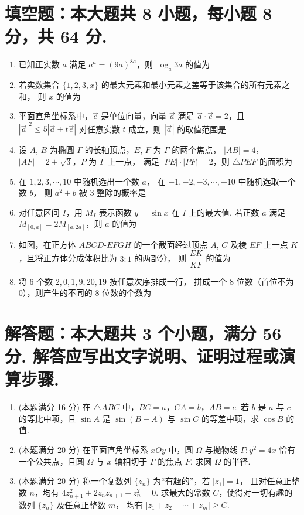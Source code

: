 \documentclass{chsmc}
\begin{document}
\section{填空题：本大题共 8 小题，每小题 8 分，共 64 分.}

\begin{enumerate}
  \item 已知正实数 $a$ 满足 $a^a = (9a)^{8a}$，则 $\log_a 3a$ 的值为 \blankline
  \item 若实数集合 $\{1, 2, 3, x\}$ 的最大元素和最小元素之差等于该集合的所有元素之和，
    则 $x$ 的值为 \blankline
  \item 平面直角坐标系中，$\vec{e}$ 是单位向量，向量 $\vec{a}$ 满足
    $\vec{a}\cdot\vec{e} = 2$，且 $|\vec{a}|^2 \leqslant 5|\vec{a} + t\vec{e}|$
    对任意实数 $t$ 成立，则 $|\vec{a}|$ 的取值范围是 \blankline
  \item 设 $A$, $B$ 为椭圆 $\Gamma$ 的长轴顶点，$E$, $F$ 为 $\Gamma$ 的两个焦点，
    $|AB| = 4$，$|AF| = 2 + \sqrt{3}$，$P$ 为 $\Gamma$ 上一点，
    满足 $|PE|\cdot|PF| = 2$，则 $\triangle PEF$ 的面积为 \blankline
  \item 在 $1, 2, 3, \cdots, 10$ 中随机选出一个数 $a$，
    在 $-1, -2, -3, \cdots, -10$ 中随机选取一个数 $b$，
    则 $a^2 + b$ 被 $3$ 整除的概率是 \blankline
  \item 对任意区间 $I$，用 $M_I$ 表示函数 $y = \sin x$ 在 $I$ 上的最大值.
    若正数 $a$ 满足 $M_{[0,a]} = 2M_{[a,2a]}$，则 $a$ 的值为 \blankline
  \item 如图，在正方体 $ABCD\text{-}EFGH$ 的一个截面经过顶点 $A$, $C$ 及棱 $EF$
    上一点 $K$，且将正方体分成体积比为 $3:1$ 的两部分，
    则 $\dfrac{EK}{KF}$ 的值为 \blankline
  \item 将 $6$ 个数 $2, 0, 1, 9, 20, 19$ 按任意次序排成一行，
    拼成一个 $8$ 位数（首位不为 $0$），则产生的不同的 $8$ 位数的个数为 \blankline
\end{enumerate}

\section{解答题：本大题共 3 个小题，满分 56 分. 解答应写出文字说明、证明过程或演算步骤.}

\begin{enumerate}[resume]
  \item (本题满分 16 分) 在 $\triangle ABC$ 中，$BC = a$，$CA = b$，$AB = c$.
    若 $b$ 是 $a$ 与 $c$ 的等比中项，且 $\sin A$ 是 $\sin(B-A)$ 与 $\sin C$
    的等差中项，求 $\cos B$ 的值.
  \item (本题满分 20 分) 在平面直角坐标系 $xOy$ 中，圆 $\Omega$ 与抛物线
    $\Gamma\colon y^2 = 4x$ 恰有一个公共点，且圆 $\Omega$ 与 $x$ 轴相切于
    $\Gamma$ 的焦点 $F$. 求圆 $\Omega$ 的半径.
  \item (本题满分 20 分) 称一个复数列 $\{z_n\}$ 为“有趣的”，若 $|z_1| = 1$，
    且对任意正整数 $n$，均有 $4z_{n+1}^2 + 2z_n z_{n+1} + z_n^2 = 0$.
    求最大的常数 $C$，使得对一切有趣的数列 $\{z_n\}$ 及任意正整数 $m$，
    均有 $|z_1 + z_2 + \cdots + z_m| \geqslant C$.
\end{enumerate}
\end{document}
